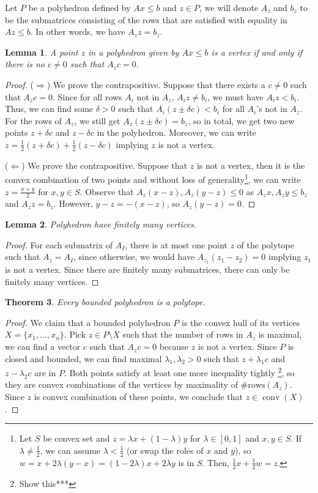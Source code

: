 \documentclass{tufte-handout}
\newtheorem{thm}{Theorem}
\newtheorem{lem}[thm]{Lemma}
\theoremstyle{definition}
\theoremstyle{remark}
\DeclareMathOperator{\conv}{conv}
\begin{document}
Let $P$ be a polyhedron defined by $Ax \leq b$ and $z \in P$, we will denote $A_z$ and $b_z$ to be the submatrices consisting of the rows that are satisfied with equality in $Az \leq b$. In other words, we have $A_zz = b_z$.
\begin{lem}\label{charvertices}
	A point $z$ in a polyhedron given by $Ax \leq b$ is a vertex if and only if there is no $c \neq 0$ such that $A_zc = 0$.
\end{lem}
\begin{proof}
	($\Rightarrow$) We prove the contrapositive. Suppose that there exists a $c \neq 0$ such that $A_zc = 0$. Since for all rows $A_i$ not in $A_z$, $A_iz \neq b_i$, we must have $A_iz < b_i$. Thus, we can find some $\delta > 0$ such that $A_i(z\pm \delta c) < b_i$ for all $A_i$'s not in $A_z$. For the rows of $A_z$, we still get $A_z(z\pm\delta c) = b_z$, so in total, we get two new points $z + \delta c$ and $z - \delta c$ in the polyhedron. Moreover, we can write $z= \frac{1}{2}(z+\delta c) + \frac{1}{2}(z - \delta c)$ implying $z$ is not a vertex.
	
	($\Leftarrow$) We prove the contrapositive. Suppose that $z$ is not a vertex, then it is the convex combination of two points and without loss of generality\footnote{Let $S$ be convex set and $z = \lambda x+ (1-\lambda)y$ for $\lambda \in [0,1]$ and $x,y \in S$. If $\lambda \neq \frac{1}{2}$, we can assume $\lambda < \frac{1}{2}$ (or swap the roles of $x$ and $y$), so $w = x+2\lambda(y-x) = (1-2\lambda)x + 2\lambda y$ is in $S$. Then, $\frac{1}{2}x + \frac{1}{2}w = z$.}, we can write $z = \frac{x+y}{2}$ for $x,y \in S$. Observe that $A_z(x-z) , A_z(y-z) \leq 0$ as $A_zx, A_zy \leq b_z$ and $A_zz = b_z$. However, $y-z = -(x-z)$, so $A_z(y-z) = 0$.
\end{proof}
\begin{lem}
	Polyhedron have finitely many vertices.
\end{lem}
\begin{proof}
	For each submatrix of $A_I$, there is at most one point $z$ of the polytope such that $A_z = A_I$, since otherwise, we would have $A_{z_1}(z_1-z_2) = 0$ implying $z_1$ is not a vertex. Since there are finitely many submatrices, there can only be finitely many vertices.
\end{proof}
\begin{thm}\label{charpolyA}
	Every bounded polyhedron is a polytope.
\end{thm}
\begin{proof}
	We claim that a bounded polyhedron $P$ is the convex hull of its vertices $X = \{x_1, \dots, x_n\}$. Pick $z \in P\setminus X$ such that the number of rows in $A_z$ is maximal, we can find a vector $c$ such that $A_zc = 0$ because $z$ is not a vertex. Since $P$ is closed and bounded, we can find maximal $\lambda_1, \lambda_2 > 0$ such that $z+\lambda_1c$ and $z-\lambda_2c$ are in $P$. Both points satisfy at least one more inequality tightly \footnote{Show this***}, so they are convex combinations of the vertices by maximality of $\text{\#rows}(A_z)$. Since $z$ is convex combination of these points, we conclude that $z \in \conv(X)$.
\end{proof}
\end{document}
